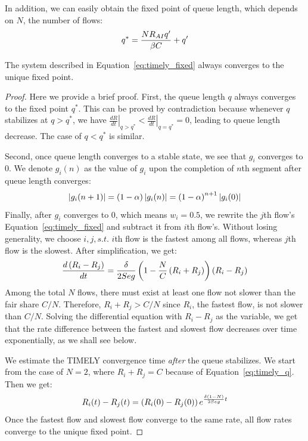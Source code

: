 In addition, we can easily obtain the fixed point of queue length, which depends on $N$, the number of flows:
\begin{equation}
\small
{q^*} = \frac{{N{R_{AI}}q'}}{{\beta C}} + q'
\label{eq:timely_fixed_q}
\end{equation}
\begin{thm}
The system described in Equation~\ref{eq:timely_fixed} always converges to the unique fixed point.
\end{thm}
\begin{proof}
Here we provide a brief proof. First, the queue length $q$ always
converges to the fixed point $q^*$. This can be proved by contradiction because whenever $q$ stabilizes
at $q>q^*$, we have ${\left. {\frac{{dR}}{{dt}}} \right|_{q > {q^*}}} < {\left. {\frac{{dR}}{{dt}}} \right|_{q = {q^*}}} = 0$, 
leading to queue length decrease. The case of $q<q^*$ is similar. 

Second, once queue length converges to a stable state, we see that $g_i$ converges to 0.
We denote ${g_i}(n)$ as the value of $g_i$ upon the completion of $n$th segment after queue
length converges:
\begin{equation}
\small
\left| {{g_i}(n + 1)} \right| = \left( {1 - \alpha} \right)\left| {{g_i}(n)} \right| = {\left( {1 - \alpha} \right)}^{n+1} \left| {{g_i}(0)} \right|
\end{equation}
Finally, after $g_i$ converges to 0, which means $w_i=0.5$, we rewrite the $j$th flow's Equation~\ref{eq:timely_fixed} 
and subtract it from $i$th flow's. Without losing generality, we choose $i,j, s.t.$ $i$th flow is the fastest among all flows,
whereas $j$th flow is the slowest. After simplification, we get:
\begin{equation}
\small
\frac{{d\left( {{R_i} - {R_j}} \right)}}{{dt}} = \frac{\delta }{{2Seg}}\left( {1 - \frac{N}{C}\left( {{R_i} + {R_j}} \right)} \right)\left( {{R_i} - {R_j}} \right)
\end{equation}
Among the total $N$ flows, there must exist at least one flow not slower than the fair share $C/N$.
Therefore, ${{R_i} + {R_j}} > C/N$ since $R_i$, the fastest flow, is not slower than $C/N$.
Solving the differential equation with ${{R_i} - {R_j}}$ as the variable, we get that the rate 
difference between the fastest and slowest flow decreases over time exponentially, as we shall see below. 

 We estimate the TIMELY convergence time {\em after}
the queue stabilizes. We start from the case of $N=2$, where $R_i + R_j = C$
because of Equation~\ref{eq:timely_q}.
Then we get:
\begin{equation}
\small
{R_i}(t) - {R_j}(t) = \left( {{R_i}(0) - {R_j}(0)} \right){e^{\frac{{\delta (1 - N)}}{{2Seg}}t}}
\end{equation}
Once the fastest flow and slowest flow converge to the same rate, all flow rates converge to the unique fixed point.
\end{proof}

